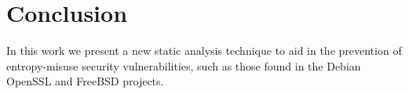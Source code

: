 \documentclass[letterpaper,twocolumn,10pt]{article}
\begin{document}
\section{Conclusion}

In this work we present a new static analysis technique to aid in the prevention of entropy-misuse security vulnerabilities, such as those
found in the Debian OpenSSL and FreeBSD projects.

{\normalsize 
}




\end{document}
